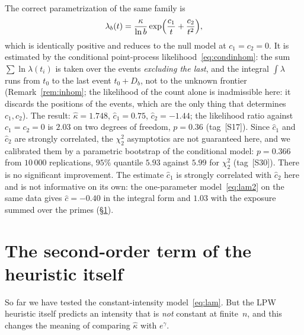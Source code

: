 \documentclass[11pt,a4paper]{article}
\theoremstyle{plain}
\theoremstyle{remark}
\newcommand{\eg}{e^{\gamma}}
\begin{document}
The correct parametrization of the same family is
\begin{equation}\label{eq:logcorr}
\lambda_b(t)=\frac{\kappa}{\ln b}\exp\Bigl(\frac{c_1}{t}+\frac{c_2}{t^2}\Bigr),
\end{equation}
which is identically positive and reduces to the null model at $c_1=c_2=0$. It
is estimated by the conditional point-process likelihood~\eqref{eq:condinhom}:
the sum $\sum\ln\lambda(t_i)$ is taken over the events \emph{excluding the last},
and the integral $\int\lambda$ runs from $t_0$ to the last event $t_0+D_b$, not
to the unknown frontier (Remark~\ref{rem:inhom}; the likelihood of the count
alone is inadmissible here: it discards the positions of the events, which are
the only thing that determines $c_1,c_2$). The result: $\hat\kappa=1.748$,
$\hat c_1=0.75$, $\hat c_2=-1.44$; the likelihood ratio against $c_1=c_2=0$ is
$2.03$ on two degrees of freedom, $p=0.36$ (tag~[S17]). Since $\hat c_1$ and
$\hat c_2$ are strongly correlated, the $\chi^2_2$ asymptotics are not guaranteed
here, and we calibrated them by a parametric bootstrap of the conditional model:
$p=0.366$ from $10\,000$ replications, $95\%$ quantile $5.93$ against $5.99$ for
$\chi^2_2$ (tag~[S30]). There is no significant improvement. The estimate $\hat c_1$ is strongly correlated with $\hat c_2$ here
and is not informative on its own: the one-parameter model~\eqref{eq:lam2} on the
same data gives $\hat c=-0.40$ in the integral form and $1.03$ with the exposure
summed over the primes (\S\ref{sec:second}).

\section{The second-order term of the heuristic itself}\label{sec:second}

So far we have tested the constant-intensity model~\eqref{eq:lam}. But the LPW
heuristic itself predicts an intensity that is \emph{not} constant at
finite~$n$, and this changes the meaning of comparing $\hat\kappa$ with $\eg$.
\end{document}
